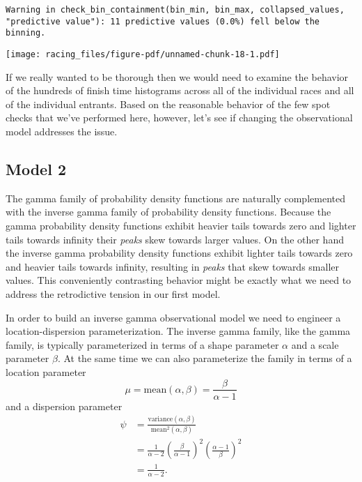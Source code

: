 \documentclass[
  letterpaper,
  DIV=11,
  numbers=noendperiod]{scrartcl}
\begin{document}
\begin{verbatim}
Warning in check_bin_containment(bin_min, bin_max, collapsed_values,
"predictive value"): 11 predictive values (0.0%) fell below the binning.
\end{verbatim}

\texttt{[image: racing\_files/figure-pdf/unnamed-chunk-18-1.pdf]}

If we really wanted to be thorough then we would need to examine the
behavior of the hundreds of finish time histograms across all of the
individual races and all of the individual entrants. Based on the
reasonable behavior of the few spot checks that we've performed here,
however, let's see if changing the observational model addresses the
issue.

\subsection{Model 2}\label{model-2}

The gamma family of probability density functions are naturally
complemented with the inverse gamma family of probability density
functions. Because the gamma probability density functions exhibit
heavier tails towards zero and lighter tails towards infinity their
\emph{peaks} skew towards larger values. On the other hand the inverse
gamma probability density functions exhibit lighter tails towards zero
and heavier tails towards infinity, resulting in \emph{peaks} that skew
towards smaller values. This conveniently contrasting behavior might be
exactly what we need to address the retrodictive tension in our first
model.

In order to build an inverse gamma observational model we need to
engineer a location-dispersion parameterization. The inverse gamma
family, like the gamma family, is typically parameterized in terms of a
shape parameter \(\alpha\) and a scale parameter \(\beta\). At the same
time we can also parameterize the family in terms of a location
parameter \[
\mu = \text{mean}(\alpha, \beta) = \frac{\beta}{\alpha - 1}
\] and a dispersion parameter \begin{align*}
\psi
&=
\frac{ \text{variance}(\alpha, \beta) }{ \text{mean}^{2}(\alpha, \beta) }
\\
&=
\frac{1}{\alpha - 2} \left( \frac{ \beta }{ \alpha - 1} \right)^{2}
\left( \frac{ \alpha - 1 }{ \beta } \right)^{2}
\\
&=
\frac{1}{\alpha - 2}.
\end{align*}
\end{document}
